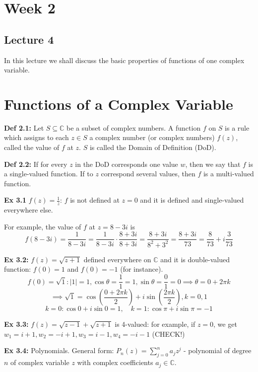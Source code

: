 \documentclass{article}
\begin{document}
\section*{Week 2}
\subsection*{Lecture 4}

In this lecture we shall discuss the basic properties of functions of one complex variable.

\section{Functions of a Complex Variable}

\textbf{Def 2.1:} Let $S \subseteq \mathbb{C}$ be a subset of complex numbers. A function $f$ on $S$ is a rule which assigns to each $z \in S$ a complex number (or complex numbers) $f(z)$, called the value of $f$ at $z$. $S$ is called the Domain of Definition (DoD).

\textbf{Def 2.2:} If for every $z$ in the DoD corresponds one value $w$, then we say that $f$ is a single-valued function. If to $z$ correspond several values, then $f$ is a multi-valued function.

\textbf{Ex 3.1} $f(z) = \frac{1}{z}$: $f$ is not defined at $z = 0$ and it is defined and single-valued everywhere else.

For example, the value of $f$ at $z = 8 - 3i$ is
$$f(8 - 3i) = \frac{1}{8 - 3i} = \frac{1}{8 - 3i} \cdot \frac{8 + 3i}{8 + 3i} = \frac{8 + 3i}{8^2 + 3^2} = \frac{8 + 3i}{73} = \frac{8}{73} + i\frac{3}{73}$$

\textbf{Ex 3.2:} $f(z) = \sqrt{z + 1}$ defined everywhere on $\mathbb{C}$ and it is double-valued function: $f(0) = 1$ and $f(0) = -1$ (for instance).
$$f(0) = \sqrt{1}: \vert 1\vert  = 1, \cos \theta = \frac{1}{1} = 1, \sin \theta = \frac{0}{1} = 0 \implies \theta = 0 + 2\pi k$$
$$\implies \sqrt{1} = \cos\left(\frac{0 + 2\pi k}{2}\right) + i\sin\left(\frac{2\pi k}{2}\right), k = 0, 1$$
$$k = 0: \cos 0 + i\sin 0 = 1, \quad k = 1: \cos \pi + i\sin \pi = -1$$

\textbf{Ex 3.3:} $f(z) = \sqrt{z - 1} + \sqrt{z + 1}$ is 4-valued: for example, if $z = 0$, we get $w_1 = i + 1, w_2 = -i + 1, w_3 = i - 1, w_4 = -i - 1$ (CHECK!)

\textbf{Ex 3.4:} Polynomials. General form: $P_n(z) = \sum_{j=0}^{n} a_j z^j$ - polynomial of degree $n$ of complex variable $z$ with complex coefficients $a_j \in \mathbb{C}$.
\end{document}
